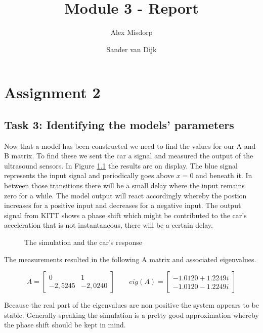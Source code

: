 \documentclass[final]{scrreprt} %
\title{Module 3 - Report}
\author{Alex {Misdorp} \and Sander {van Dijk}}
\begin{document}
\chapter{Assignment 2}
\section*{Task 3: Identifying the models' parameters}

Now that a model has been constructed we need to find the values for our A and B matrix. To find these we sent the car a signal and measured the output of the ultrasound sensors. In Figure \ref{fig:KITT-input-output-model} the results are on display.
The blue signal represents the input signal and periodically goes above $x=0$ and beneath it. In between those transitions there will be a small delay where the input remains zero for a while. The model output will react accordingly whereby the postion increases for a positive input and decreases for a negative input.
The output signal from KITT shows a phase shift which might be contributed to the car's acceleration that is not instantaneous, there will be a certain delay.

\begin{figure}[H]
	\centering
    	\setlength\figureheight{4cm}
    	\setlength{}
    	    	
    	\caption{The simulation and the car's response}
    	\label{fig:KITT-input-output-model}
\end{figure}

The measurements resulted in the following A matrix and associated eigenvalues.

\begin{equation}
A=
\begin{bmatrix}
  0 & 1 \\
  -2,5245 & -2,0240
 \end{bmatrix}
\qquad
eig(A)=
\begin{bmatrix}
 -1.0120 + 1.2249i \\
  -1.0120 - 1.2249i
 \end{bmatrix}
\end{equation}

Because the real part of the eigenvalues are non positive the system appears to be stable. Generally speaking the simulation is a pretty good approximation whereby the phase shift should be kept in mind.
\end{document}

